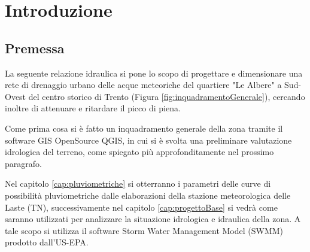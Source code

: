 \chapter{Introduzione}
\section{Premessa}
La seguente relazione idraulica si pone lo scopo di progettare e dimensionare una rete di drenaggio urbano delle acque meteoriche del quartiere "Le Albere" a Sud-Ovest del centro storico di Trento (Figura \ref{fig:inquadramentoGenerale}), cercando inoltre di attenuare e ritardare il picco di piena.


Come prima cosa si è fatto un inquadramento generale della zona tramite il software GIS OpenSource QGIS, in cui si è svolta una preliminare valutazione idrologica del terreno, come spiegato più approfonditamente nel prossimo paragrafo.




Nel capitolo \ref{cap:pluviometriche} si otterranno i parametri delle curve di possibilità pluviometriche dalle elaborazioni della stazione meteorologica delle Laste (TN), successivamente nel capitolo \ref{cap:progettoBase} si vedrà come saranno utilizzati per analizzare la situazione idrologica e idraulica della zona. A tale scopo si utilizza il software Storm Water Management Model (SWMM) prodotto dall'US-EPA.

